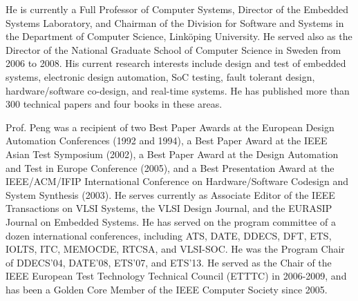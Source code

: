 \documentclass[conference]{IEEEtran}
\begin{document}
  He is currently a Full Professor of Computer Systems, Director of the Embedded Systems Laboratory, and Chairman of the Division for Software and Systems in the Department of Computer Science, Link\"{o}ping University.
  He served also as the Director of the National Graduate School of Computer Science in Sweden from 2006 to 2008.
  His current research interests include design and test of embedded systems, electronic design automation, SoC testing, fault tolerant design, hardware/software co-design, and real-time systems.
  He has published more than 300 technical papers and four books in these areas.

  Prof. Peng was a recipient of two Best Paper Awards at the European Design Automation Conferences (1992 and 1994), a Best Paper Award at the IEEE Asian Test Symposium (2002), a Best Paper Award at the Design Automation and Test in Europe Conference (2005), and a Best Presentation Award at the IEEE/ACM/IFIP International Conference on Hardware/Software Codesign and System Synthesis (2003).
  He serves currently as Associate Editor of the IEEE Transactions on VLSI Systems, the VLSI Design Journal, and the EURASIP Journal on Embedded Systems.
  He has served on the program committee of a dozen international conferences, including ATS, DATE, DDECS, DFT, ETS, IOLTS, ITC, MEMOCDE, RTCSA, and VLSI-SOC.
  He was the Program Chair of DDECS'04, DATE'08, ETS'07, and ETS'13.
  He served as the Chair of the IEEE European Test Technology Technical Council (ETTTC) in 2006-2009, and has been a Golden Core Member of the IEEE Computer Society since 2005.
\end{document}
